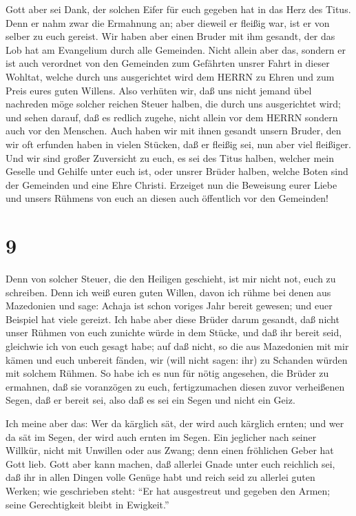  Gott aber sei Dank, der solchen Eifer für euch gegeben hat
in das Herz des Titus.  Denn er nahm zwar die Ermahnung an;
aber dieweil er fleißig war, ist er von selber zu euch gereist.
 Wir haben aber einen Bruder mit ihm gesandt, der das Lob
hat am Evangelium durch alle Gemeinden.  Nicht allein aber
das, sondern er ist auch verordnet von den Gemeinden zum Gefährten
unsrer Fahrt in dieser Wohltat, welche durch uns ausgerichtet wird dem
HERRN zu Ehren und zum Preis eures guten Willens.  Also
verhüten wir, daß uns nicht jemand übel nachreden möge solcher reichen
Steuer halben, die durch uns ausgerichtet wird;  und sehen
darauf, daß es redlich zugehe, nicht allein vor dem HERRN sondern auch
vor den Menschen.  Auch haben wir mit ihnen gesandt unsern
Bruder, den wir oft erfunden haben in vielen Stücken, daß er fleißig
sei, nun aber viel fleißiger.  Und wir sind großer
Zuversicht zu euch, es sei des Titus halben, welcher mein Geselle und
Gehilfe unter euch ist, oder unsrer Brüder halben, welche Boten sind der
Gemeinden und eine Ehre Christi.  Erzeiget nun die
Beweisung eurer Liebe und unsers Rühmens von euch an diesen auch
öffentlich vor den Gemeinden!

\hypertarget{section-8}{%
\section{9}\label{section-8}}

 Denn von solcher Steuer, die den Heiligen geschieht, ist
mir nicht not, euch zu schreiben.  Denn ich weiß euren guten
Willen, davon ich rühme bei denen aus Mazedonien und sage: Achaja ist
schon voriges Jahr bereit gewesen; und euer Beispiel hat viele gereizt.
 Ich habe aber diese Brüder darum gesandt, daß nicht unser
Rühmen von euch zunichte würde in dem Stücke, und daß ihr bereit seid,
gleichwie ich von euch gesagt habe;  auf daß nicht, so die
aus Mazedonien mit mir kämen und euch unbereit fänden, wir (will nicht
sagen: ihr) zu Schanden würden mit solchem Rühmen.  So habe
ich es nun für nötig angesehen, die Brüder zu ermahnen, daß sie
voranzögen zu euch, fertigzumachen diesen zuvor verheißenen Segen, daß
er bereit sei, also daß es sei ein Segen und nicht ein Geiz.

 Ich meine aber das: Wer da kärglich sät, der wird auch
kärglich ernten; und wer da sät im Segen, der wird auch ernten im Segen.
 Ein jeglicher nach seiner Willkür, nicht mit Unwillen oder
aus Zwang; denn einen fröhlichen Geber hat Gott lieb.  Gott
aber kann machen, daß allerlei Gnade unter euch reichlich sei, daß ihr
in allen Dingen volle Genüge habt und reich seid zu allerlei guten
Werken;  wie geschrieben steht: ``Er hat ausgestreut und
gegeben den Armen; seine Gerechtigkeit bleibt in Ewigkeit.''

